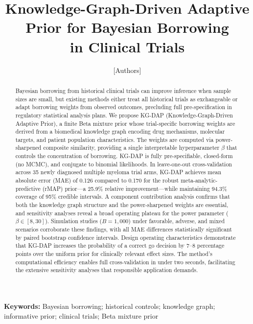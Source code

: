 \documentclass[12pt]{article}
\title{Knowledge-Graph-Driven Adaptive Prior for Bayesian Borrowing\\in Clinical Trials}
\author{[Authors]}
\date{}
\begin{document}
\maketitle

\begin{abstract}
Bayesian borrowing from historical clinical trials can improve inference when sample sizes are small, but existing methods either treat all historical trials as exchangeable or adapt borrowing weights from observed outcomes, precluding full pre-specification in regulatory statistical analysis plans. We propose KG-DAP (Knowledge-Graph-Driven Adaptive Prior), a finite Beta mixture prior whose trial-specific borrowing weights are derived from a biomedical knowledge graph encoding drug mechanisms, molecular targets, and patient population characteristics. The weights are computed via power-sharpened composite similarity, providing a single interpretable hyperparameter $\beta$ that controls the concentration of borrowing. KG-DAP is fully pre-specifiable, closed-form (no MCMC), and conjugate to binomial likelihoods. In leave-one-out cross-validation across 35 newly diagnosed multiple myeloma trial arms, KG-DAP achieves mean absolute error (MAE) of 0.126 compared to 0.170 for the robust meta-analytic-predictive (rMAP) prior---a 25.9\% relative improvement---while maintaining 94.3\% coverage of 95\% credible intervals. A component contribution analysis confirms that both the knowledge graph structure and the power-sharpened weights are essential, and sensitivity analyses reveal a broad operating plateau for the power parameter ($\beta \in [8, 30]$). Simulation studies ($B = 1{,}000$) under favorable, adverse, and mixed scenarios corroborate these findings, with all MAE differences statistically significant by paired bootstrap confidence intervals. Design operating characteristics demonstrate that KG-DAP increases the probability of a correct go decision by 7--8 percentage points over the uniform prior for clinically relevant effect sizes. The method's computational efficiency enables full cross-validation in under two seconds, facilitating the extensive sensitivity analyses that responsible application demands.
\end{abstract}

\noindent\textbf{Keywords:} Bayesian borrowing; historical controls; knowledge graph; informative prior; clinical trials; Beta mixture prior
\end{document}
